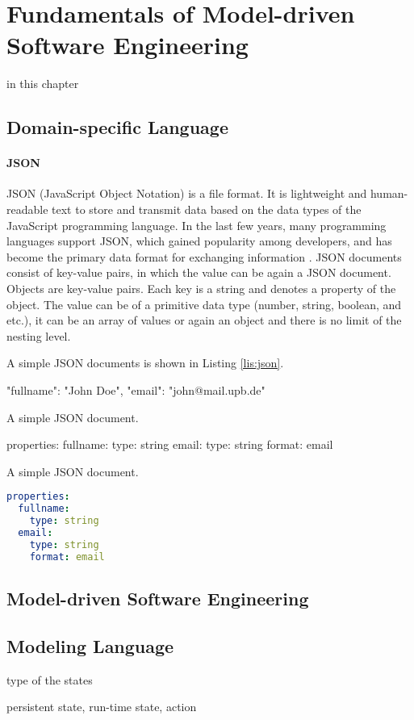 \chapter{Fundamentals of Model-driven Software Engineering}
\label{ch:fundamentals}

in this chapter

\section{Domain-specific Language}
\subsubsection{JSON}
JSON (JavaScript Object Notation) is a file format. It is lightweight and human-readable text to store and transmit data based on the data types of the JavaScript programming language. In the last few years, many programming languages support JSON, which gained popularity among developers, and has become the primary data format for exchanging information \cite{json-schema}. JSON documents consist of key-value pairs, in which the value can be again a JSON document. Objects are key-value pairs. Each key is a string and denotes a property of the object. The value can be of a primitive data type (number, string, boolean, and etc.), it can be an array of values or again an object and there is no limit of the nesting level. 

A simple JSON documents is shown in Listing \ref{lis:json}.

\FloatBarrier
\begin{code}
\begin{json}
{
    "fullname": "John Doe",
    "email": "john@mail.upb.de"
}
\end{json}
\caption{A simple JSON document.}
\label{lis:json}
\end{code}
\FloatBarrier

\pagebreak
\FloatBarrier
\begin{code}
\begin{yaml}
properties:
  fullname:
    type: string
  email:
    type: string
    format: email
\end{yaml}
\caption{A simple JSON document.}
\label{lis:json}
\end{code}
\FloatBarrier
\lstset{
  label=lis:yaml-simple, caption=Example of expressing JSON Schema in YAML syntax., 
}
\begin{lstlisting}[language=yaml]
properties:
  fullname:
    type: string
  email:
    type: string
    format: email
\end{lstlisting}


\section{Model-driven Software Engineering}
\section{Modeling Language}

type of the states

persistent state, run-time state, action
